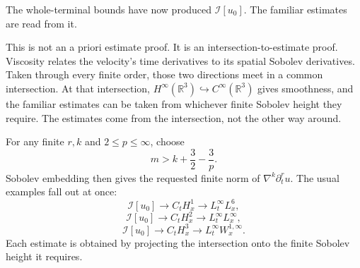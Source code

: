 \documentclass[11pt]{article}
\begin{document}
The whole-terminal bounds have now produced \(\mathcal I[u_0]\). The familiar estimates are read from it.

This is not an a priori estimate proof. It is an intersection-to-estimate proof. Viscosity relates the velocity's time derivatives to its spatial Sobolev derivatives. Taken through every finite order, those two directions meet in a common intersection. At that intersection, \(H^\infty(\mathbb R^3)\hookrightarrow C^\infty(\mathbb R^3)\) gives smoothness, and the familiar estimates can be taken from whichever finite Sobolev height they require. The estimates come from the intersection, not the other way around.

For any finite \(r,k\) and \(2\leq p\leq\infty\), choose
\[
m>k+\frac32-\frac3p.
\]
Sobolev embedding then gives the requested finite norm of \(\nabla^k\partial_t^ru\). The usual examples fall out at once:
\[
\mathcal I[u_0]
\longrightarrow C_tH_x^1
\longrightarrow L_t^\infty L_x^6,
\]
\[
\mathcal I[u_0]
\longrightarrow C_tH_x^2
\longrightarrow L_t^\infty L_x^\infty,
\]
\[
\mathcal I[u_0]
\longrightarrow C_tH_x^3
\longrightarrow L_t^\infty W_x^{1,\infty}.
\]
Each estimate is obtained by projecting the intersection onto the finite Sobolev height it requires.
\end{document}
